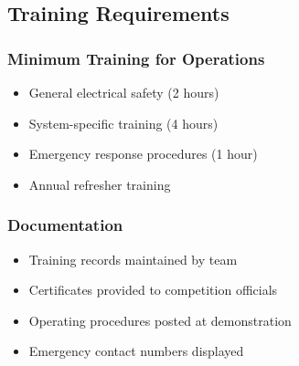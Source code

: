 \subsection{Training Requirements}

\subsubsection{Minimum Training for Operations}
\begin{itemize}[noitemsep]
    \item General electrical safety (2 hours)
    \item System-specific training (4 hours)
    \item Emergency response procedures (1 hour)
    \item Annual refresher training
\end{itemize}

\subsubsection{Documentation}
\begin{itemize}[noitemsep]
    \item Training records maintained by team
    \item Certificates provided to competition officials
    \item Operating procedures posted at demonstration
    \item Emergency contact numbers displayed
\end{itemize}
